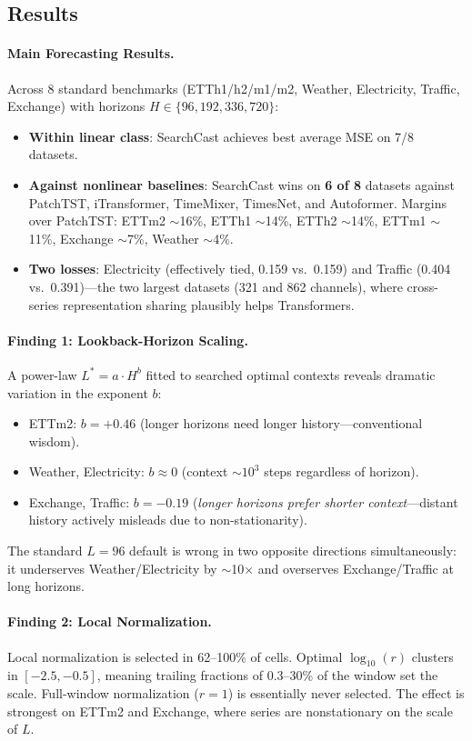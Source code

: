 \documentclass[11pt,a4paper]{article}
\begin{document}
\subsection{Results}

\paragraph{Main Forecasting Results.} Across 8 standard benchmarks (ETTh1/h2/m1/m2, Weather, Electricity, Traffic, Exchange) with horizons $H \in \{96, 192, 336, 720\}$:
\begin{itemize}
\item \textbf{Within linear class}: SearchCast achieves best average MSE on 7/8 datasets.
\item \textbf{Against nonlinear baselines}: SearchCast wins on \textbf{6 of 8} datasets against PatchTST, iTransformer, TimeMixer, TimesNet, and Autoformer. Margins over PatchTST: ETTm2 $\sim$16\%, ETTh1 $\sim$14\%, ETTh2 $\sim$14\%, ETTm1 $\sim$11\%, Exchange $\sim$7\%, Weather $\sim$4\%.
\item \textbf{Two losses}: Electricity (effectively tied, 0.159 vs.\ 0.159) and Traffic (0.404 vs.\ 0.391)---the two largest datasets (321 and 862 channels), where cross-series representation sharing plausibly helps Transformers.
\end{itemize}

\paragraph{Finding 1: Lookback-Horizon Scaling.} A power-law $L^* = a \cdot H^b$ fitted to searched optimal contexts reveals dramatic variation in the exponent $b$:
\begin{itemize}
\item ETTm2: $b = +0.46$ (longer horizons need longer history---conventional wisdom).
\item Weather, Electricity: $b \approx 0$ (context $\sim 10^3$ steps regardless of horizon).
\item Exchange, Traffic: $b = -0.19$ (\emph{longer horizons prefer shorter context}---distant history actively misleads due to non-stationarity).
\end{itemize}
The standard $L = 96$ default is wrong in two opposite directions simultaneously: it underserves Weather/Electricity by $\sim$10$\times$ and overserves Exchange/Traffic at long horizons.

\paragraph{Finding 2: Local Normalization.} Local normalization is selected in 62--100\% of cells. Optimal $\log_{10}(r)$ clusters in $[-2.5, -0.5]$, meaning trailing fractions of 0.3--30\% of the window set the scale. Full-window normalization ($r = 1$) is essentially never selected. The effect is strongest on ETTm2 and Exchange, where series are nonstationary on the scale of $L$.
\end{document}
